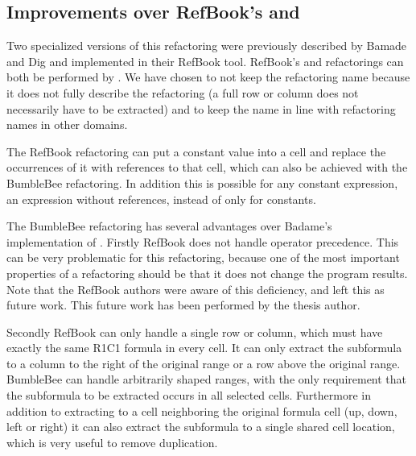 \subsection{Improvements over RefBook's  and }
\label{subsubsec:improvementsextractformula}

Two specialized versions of this refactoring were previously described by Bamade and Dig \cite{badame2012refactoring} and implemented in their RefBook tool.
RefBook's  and  refactorings can both be performed by .
We have chosen to not keep the  refactoring name because it does not fully describe the refactoring (a full row or column does not necessarily have to be extracted) and to keep the name in line with refactoring names in other domains.

The RefBook  refactoring can put a constant value into a cell and replace the occurrences of it with references to that cell, which can also be achieved with the BumbleBee  refactoring.
In addition this is possible for any constant expression, an expression without references, instead of only for constants.

The BumbleBee  refactoring has several advantages over Badame's implementation of .
Firstly RefBook does not handle operator precedence.
This can be very problematic for this refactoring, because one of the most important properties of a refactoring should be that it does not change the program results.
Note that the RefBook authors were aware of this deficiency, and left this as future work.
This future work has been performed by the thesis author.

Secondly RefBook can only handle a single row or column, which must have exactly the same R1C1 formula in every cell.
It can only extract the subformula to a column to the right of the original range or a row above the original range.
BumbleBee can handle arbitrarily shaped ranges, with the only requirement that the subformula to be extracted occurs in all selected cells.
Furthermore in addition to extracting to a cell neighboring the original formula cell (up, down, left or right) it can also extract the subformula to a single shared cell location, which is very useful to remove duplication.

\section{}
\label{refac:inlineformula}

